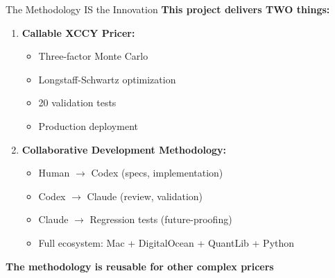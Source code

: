 \documentclass[aspectratio=169,11pt]{beamer}
\begin{document}
\begin{frame}{The Methodology IS the Innovation}
\textbf{This project delivers TWO things:}

\begin{enumerate}
    \item \textbf{Callable XCCY Pricer:}
    \begin{itemize}
        \item Three-factor Monte Carlo
        \item Longstaff-Schwartz optimization
        \item 20 validation tests
        \item Production deployment
    \end{itemize}

    \item \textbf{Collaborative Development Methodology:}
    \begin{itemize}
        \item Human $\to$ Codex (specs, implementation)
        \item Codex $\to$ Claude (review, validation)
        \item Claude $\to$ Regression tests (future-proofing)
        \item Full ecosystem: Mac + DigitalOcean + QuantLib + Python
    \end{itemize}
\end{enumerate}

\vspace{0.3cm}
\textbf{The methodology is reusable for other complex pricers}

\end{frame}
\end{document}
